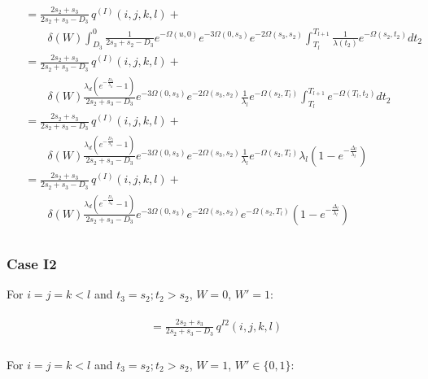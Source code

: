 \documentclass{article}
\begin{document}
\begin{align}
    \begin{split}
        &= \frac{2s_2+s_3}{2s_2+s_3-D_3}\,q^{(I)}(i,j,k,l)+\\
        &\qquad \delta(W)
        \int_{D_3}^{0}\frac{1}{2s_3+s_2-D_3}e^{-\Omega(u,0)}e^{-3\Omega(0,s_3)}e^{-2\Omega(s_3,s_2)}
        \int_{T_l}^{T_{l+1}}\frac{1}{\lambda(t_2)}e^{-\Omega(s_2,t_2)}dt_2\\
        &= \frac{2s_2+s_3}{2s_2+s_3-D_3}\,q^{(I)}(i,j,k,l)+\\
        &\qquad \delta(W)
        \frac{\lambda_d\left(e^{-\frac{D_3}{\lambda_d}}-1\right)}{2s_2+s_3-D_3}e^{-3\Omega(0,s_3)}e^{-2\Omega(s_3,s_2)}
        \frac{1}{\lambda_l}e^{-\Omega(s_2,T_l)}\int_{T_l}^{T_{l+1}}e^{-\Omega(T_l,t_2)}dt_2\\
        &= \frac{2s_2+s_3}{2s_2+s_3-D_3}\,q^{(I)}(i,j,k,l)+\\
        &\qquad \delta(W)
        \frac{\lambda_d\left(e^{-\frac{D_3}{\lambda_d}}-1\right)}{2s_2+s_3-D_3}e^{-3\Omega(0,s_3)}e^{-2\Omega(s_3,s_2)}
        \frac{1}{\lambda_l}e^{-\Omega(s_2,T_l)}\lambda_l\left(1-e^{-\frac{\Delta_l}{\lambda_l}}\right)\\
        &= \frac{2s_2+s_3}{2s_2+s_3-D_3}\,q^{(I)}(i,j,k,l)+\\
        &\qquad \delta(W)
        \frac{\lambda_d\left(e^{-\frac{D_3}{\lambda_d}}-1\right)}{2s_2+s_3-D_3}e^{-3\Omega(0,s_3)}e^{-2\Omega(s_3,s_2)}
        e^{-\Omega(s_2,T_l)}\left(1-e^{-\frac{\Delta_l}{\lambda_l}}\right)\\
    \end{split}
\end{align}

\subsubsection{Case I2}
For $i=j=k<l$ and $t_3=s_2;t_2>s_2$, $W = 0$, $W' = 1$:

\begin{align}
    \begin{split}
        &= \frac{2s_2+s_3}{2s_2+s_3-D_3}\,q^{I2}(i,j,k,l)\\
    \end{split}
\end{align}

For $i=j=k<l$ and $t_3=s_2;t_2>s_2$, $W = 1$, $W' \in \{0,1\}$:
\end{document}
